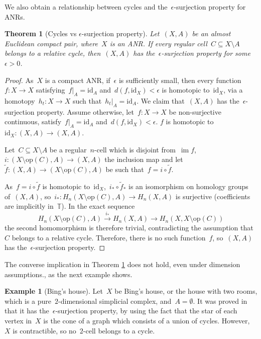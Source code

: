\documentclass[english,11pt]{article}
\theoremstyle{plain}
\newtheorem{theorem}{Theorem}[section]
\theoremstyle{remark}
\theoremstyle{definition}
\newtheorem{example}{Example}[section]
\newcommand{\id}{\mathrm{id}}
\newcommand{\op}[1]{\mathrm{op}(#1)}
\newcommand{\R}{\mathbb{R}}
\newcommand{\Z}{\mathbb{Z}}
\newcommand{\RZ}{\mathbb{T}}%
\newcommand{\im}{\mathop{\mathrm{im}}}
\begin{document}
We also obtain a relationship between cycles and the~$\epsilon$-surjection property for ANRs.
\begin{theorem}[Cycles vs $\epsilon$-surjection property]\label{thm_cycle_epsilon}
Let~$(X,A)$ be an almost Euclidean compact pair, where~$X$ is an ANR. If every regular cell~$C\subseteq X\setminus A$ belongs to a relative cycle, then~$(X,A)$ has the~$\epsilon$-surjection property for some~$\epsilon>0$. 
\end{theorem}
\begin{proof}
As~$X$ is a compact ANR, if~$\epsilon$ is sufficiently small, then every function~$f:X\to X$ satisfying~$f|_A=\id_A$ and~$d(f,\id_X)<\epsilon$ is homotopic to~$\id_X$, via a homotopy~$h_t:X\to X$ such that~$h_t|_A=\id_A$. We claim that~$(X,A)$ has the~$\epsilon$-surjection property. Assume otherwise, let~$f:X\to X$ be non-surjective continuous, satisfy~$f|_A=\id_A$ and~$d(f,\id_X)<\epsilon$. $f$ is homotopic to~$\id_X:(X,A)\to (X,A)$.

Let~$C\subseteq X\setminus A$ be a regular~$n$-cell which is disjoint from~$\im f$,~$i:(X\setminus \op{C},A)\to (X,A)$ the inclusion map and let~$\widetilde{f}:(X,A)\to (X\setminus \op{C},A)$ be such that~$f=i\circ \widetilde{f}$.

As~$f=i\circ \widetilde{f}$ is homotopic to~$\id_X$,~$i_*\circ \widetilde{f}_*$ is an isomorphism on homology groups of~$(X,A)$, so~$i_*:H_n(X\setminus \op{C},A)\to H_n(X,A)$ is surjective (coefficients are implicitly in~$\RZ$). In the exact sequence
\begin{equation*}
H_n(X\setminus \op{C},A)\stackrel{i_*}{\longrightarrow} H_n(X,A)\longrightarrow H_n(X,X\setminus \op{C})
\end{equation*}
the second homomorphism is therefore trivial, contradicting the assumption that~$C$ belongs to a relative cycle. Therefore, there is no such function~$f$, so~$(X,A)$ has the~$\epsilon$-surjection property.
\end{proof}

The converse implication in Theorem \ref{thm_cycle_epsilon} does not hold, even under dimension assumptions., as the next example shows.
\begin{example}[Bing's house]
Let~$X$ be Bing's house, or the house with two rooms, which is a pure~$2$-dimensional simplicial complex, and~$A=\emptyset$. It was  proved in \cite{AH22} that it has the~$\epsilon$-surjection property, by using the fact that the star of each vertex in~$X$ is the cone of a graph which consists of a union of cycles. However,~$X$ is contractible, so no~$2$-cell belongs to a cycle.
\end{example}
\end{document}
